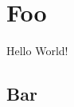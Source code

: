 \documentclass{unireport}
\begin{document}
\section{Foo}
\showthe\footskip
Hello World!
\subsection{Bar}
\lipsum
\end{document}
